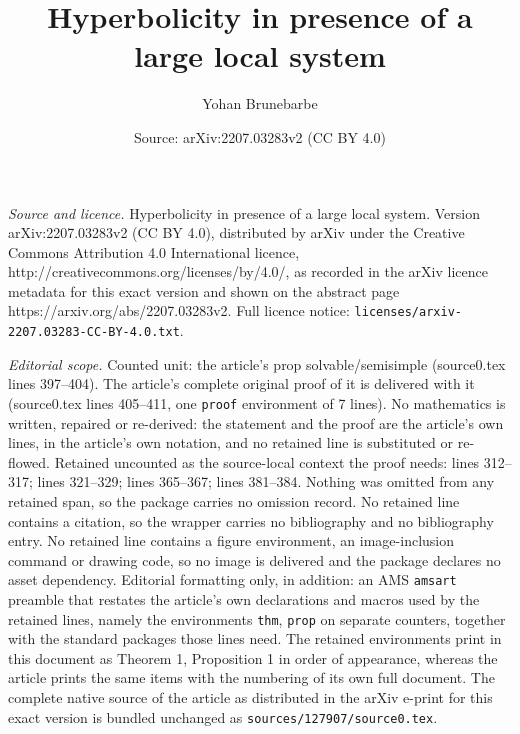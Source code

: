 \documentclass[10pt,a4paper]{amsart}
\title{Hyperbolicity in presence of a large local system}
\author{Yohan Brunebarbe}
\date{Source: arXiv:2207.03283v2 (CC BY 4.0)}
\begin{document}
\maketitle

\noindent\emph{Source and licence.} Hyperbolicity in presence of a large local system. Version arXiv:2207.03283v2 (CC BY 4.0), distributed by arXiv under the Creative Commons Attribution 4.0 International licence, http://creativecommons.org/licenses/by/4.0/, as recorded in the arXiv licence metadata for this exact version and shown on the abstract page https://arxiv.org/abs/2207.03283v2. Full licence notice: \texttt{licenses/arxiv-2207.03283-CC-BY-4.0.txt}.\par\smallskip

\noindent\textit{Editorial scope.} Counted unit: the article's prop solvable/semisimple (source0.tex lines 397--404). The article's complete original proof of it is delivered with it (source0.tex lines 405--411, one \texttt{proof} environment of 7 lines). No mathematics is written, repaired or re-derived: the statement and the proof are the article's own lines, in the article's own notation, and no retained line is substituted or re-flowed.  Retained uncounted as the source-local context the proof needs: lines 312--317; lines 321--329; lines 365--367; lines 381--384.  Nothing was omitted from any retained span, so the package carries no omission record.  No retained line contains a citation, so the wrapper carries no bibliography and no bibliography entry.  No retained line contains a figure environment, an image-inclusion command or drawing code, so no image is delivered and the package declares no asset dependency.  Editorial formatting only, in addition: an AMS \texttt{amsart} preamble that restates the article's own declarations and macros used by the retained lines, namely the environments \texttt{thm}, \texttt{prop} on separate counters, together with the standard packages those lines need.  The retained environments print in this document as Theorem 1, Proposition 1 in order of appearance, whereas the article prints the same items with the numbering of its own full document.  The complete native source of the article as distributed in the arXiv e-print for this exact version is bundled unchanged as \texttt{sources/127907/source0.tex}.
\end{document}
